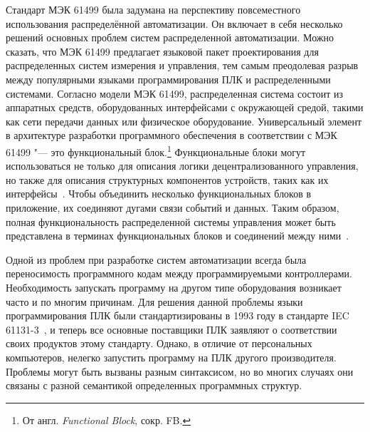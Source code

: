 Стандарт МЭК 61499 была задумана на перспективу повсеместного использования распределённой автоматизации. Он включает в себя несколько решений основных проблем систем распределенной автоматизации. Можно сказать, что МЭК 61499 предлагает языковой пакет проектирования для распределенных систем измерения и управления, тем самым преодолевая разрыв между популярными языками программирования ПЛК и распределенными системами. Согласно модели МЭК 61499, распределенная система состоит из аппаратных средств, оборудованных интерфейсами с окружающей средой, такими как сети передачи данных или физическое оборудование. Универсальный элемент в архитектуре разработки программного обеспечения в соответствии с МЭК 61499 "--- это функциональный блок.\footnote{От англ. \textit{Functional Block}, сокр. FB.} Функциональные блоки могут использоваться не только для описания логики децентрализованного управления, но также для описания структурных компонентов устройств, таких как их интерфейсы~\cite{patil2018adapting}. Чтобы объединить несколько функциональных блоков в приложение, их соединяют дугами связи событий и данных. Таким образом, полная функциональность распределенной системы управления может быть представлена ​​в терминах функциональных блоков и соединений между ними~\cite{vyatkin2011iec}.

Одной из проблем при разработке систем автоматизации всегда была переносимость программного кодам между программируемыми контроллерами. Необходимость запускать программу на другом типе оборудования возникает часто и по многим причинам. Для решения данной проблемы языки программирования ПЛК были стандартизированы в 1993 году в стандарте IEC 61131-3~\cite{dai2009case}, и теперь все основные поставщики ПЛК заявляют о соответствии своих продуктов этому стандарту. Однако, в отличие от персональных компьютеров, нелегко запустить программу на ПЛК другого производителя. Проблемы могут быть вызваны разным синтаксисом, но во многих случаях они связаны с разной семантикой определенных программных структур.

